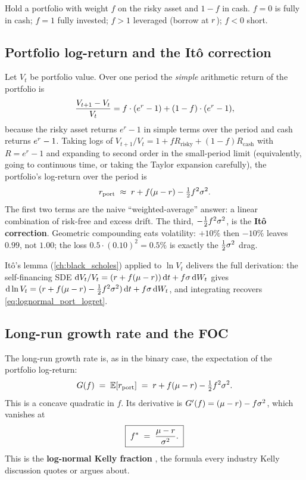 Hold a portfolio with weight $f$ on the risky asset and $1-f$ in
cash. $f = 0$ is fully in cash; $f = 1$ fully invested; $f > 1$
leveraged (borrow at $r$); $f < 0$ short.

\subsection{Portfolio log-return and the It\^o correction}

Let $V_t$ be portfolio value. Over one period the \emph{simple}
arithmetic return of the portfolio is
\begin{equation}
  \frac{V_{t+1} - V_t}{V_t}
  = f \cdot (e^{r} - 1) + (1 - f) \cdot (e^{r} - 1),
\end{equation}
because the risky asset returns $e^{r} - 1$ in simple terms over
the period and cash returns $e^{r} - 1$.
Taking logs of $V_{t+1}/V_t = 1 + fR_{\text{risky}} + (1-f)
R_{\text{cash}}$ with $R = e^r - 1$ and expanding to second order
in the small-period limit (equivalently, going to continuous
time, or taking the Taylor expansion carefully), the portfolio's
log-return over the period is
\begin{equation}
  r_\text{port} \;\approx\; r + f(\mu - r) - \tfrac12 f^2
  \sigma^2.
  \label{eq:lognormal_port_logret}
\end{equation}
The first two terms are the naive ``weighted-average'' answer: a
linear combination of risk-free and excess drift. The third,
$-\tfrac12 f^2 \sigma^2$, is the \textbf{It\^o correction}.
Geometric compounding eats volatility: $+10\%$ then $-10\%$ leaves
$0.99$, not $1.00$; the loss $0.5 \cdot (0.10)^2 = 0.5\%$ is
exactly the $\tfrac12\sigma^2$ drag.

It\^o's lemma (\cref{ch:black_scholes}) applied to $\ln V_t$
delivers the full derivation: the self-financing SDE
$\mathrm dV_t/V_t = (r + f(\mu-r))\,\mathrm dt +
f\sigma\,\mathrm dW_t$ gives $\mathrm d\ln V_t = (r + f(\mu-r)
- \tfrac12 f^2\sigma^2)\,\mathrm dt + f\sigma\,\mathrm dW_t$, and
integrating recovers \eqref{eq:lognormal_port_logret}.

\subsection{Long-run growth rate and the FOC}

The long-run growth rate is, as in the binary case, the
expectation of the portfolio log-return:
\begin{equation}
  G(f) \;=\; \mathbb{E}[r_\text{port}]
  \;=\; r + f(\mu - r) - \tfrac12 f^2 \sigma^2.
\end{equation}
This is a concave quadratic in $f$. Its derivative is
$G'(f) = (\mu - r) - f\sigma^2$, which vanishes at
\begin{equation}
  \boxed{\;f^{*} \;=\; \frac{\mu - r}{\sigma^2}.\;}
  \label{eq:kelly_lognormal}
\end{equation}
This is the \textbf{log-normal Kelly fraction}
\citep{thorp2006kelly, chan2013algorithmic}, the formula every
industry Kelly discussion quotes or argues about.

